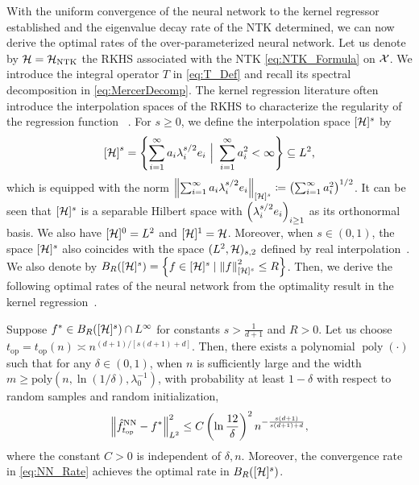 With the uniform convergence of the neural network to the kernel regressor established and the eigenvalue decay rate of the NTK determined,
we can now derive the optimal rates of the over-parameterized neural network.
Let us denote by $\mathcal{H} = \mathcal{H}_{\mathrm{NTK}}$ the RKHS associated with the NTK \cref{eq:NTK_Formula} on $\mathcal{X}$.
We introduce the integral operator $T$ in \cref{eq:T_Def} and recall its spectral decomposition in \cref{eq:MercerDecomp}.
The kernel regression literature often introduce the interpolation spaces of the RKHS to characterize the regularity of the regression function
~\citep{steinwart2012_MercerTheorem,fischer2020_SobolevNorm}.
For $s \geq 0$, we define the interpolation space $[\mathcal{H}]^s$ by
\begin{align}
  \left[\mathcal{H}\right]^s = \left\{ \sum_{i =1}^\infty a_i \lambda_i^{s/2} e_i ~\Big|~ \sum_{i =1}^\infty a_i^2 < \infty \right\}
  \subseteq L^2,
\end{align}
which is equipped with the norm $\norm{\sum_{i =1}^\infty a_i \lambda_i^{s/2} e_i}_{[\mathcal{H}]^s} \coloneqq \left(  \sum_{i =1}^\infty a_i^2  \right)^{1/2}$.
It can be seen that $[\mathcal{H}]^s$ is a separable Hilbert space with $\left(\lambda_i^{s/2} e_i\right)_{i \geq 1}$ as its orthonormal basis.
We also have $[\mathcal{H}]^0 = L^2$ and $[\mathcal{H}]^1 = \mathcal{H}$.
Moreover, when $s \in (0,1)$,
the space $[\mathcal{H}]^s$ also coincides with the space $(L^2,\mathcal{H})_{s,2}$ defined by real interpolation~\citep{steinwart2012_MercerTheorem}.
We also denote by $B_R([\mathcal{H}]^s) = \left\{ f \in [\mathcal{H}]^s \mid \norm{f}_{[\mathcal{H}]^s}^2 \leq R \right\}$.
Then, we derive the following optimal rates of the neural network from the optimality result in the kernel regression~\citep{lin2018_OptimalRates}.

\begin{proposition}
  \label{prop:NN_Gen}
  Suppose $f^* \in B_R([\mathcal{H}]^s) \cap L^\infty$ for constants $s > \frac{1}{d+1}$ and $R > 0$.
  Let us choose $t_{\mathrm{op}} = t_{\mathrm{op}}(n) \asymp n^{(d+1)/ [s(d+1)+d]}$.
  Then, there exists a polynomial $\operatorname{poly}(\cdot)$ such that for any $\delta \in (0,1)$,
  when $n$ is sufficiently large and the width $m \geq \mathrm{poly}(n,\ln(1/\delta),\lambda_{0}^{-1})$,
  with probability at least $1-\delta$ with respect to random samples and random initialization,
  \begin{align}
    \label{eq:NN_Rate}
    \norm{\hat{f}^{\mathrm{NN}}_{t_{\mathrm{op}}} - f^*}_{L^2}^2 \leq C \left( \ln\frac{12}{\delta} \right)^2 n^{-\frac{s(d+1)}{s(d+1)+d}},
  \end{align}
  where the constant $C>0$ is independent of $\delta,n$.
  Moreover, the convergence rate in \cref{eq:NN_Rate} achieves the optimal rate in $B_R([\mathcal{H}]^s)$.
\end{proposition}

